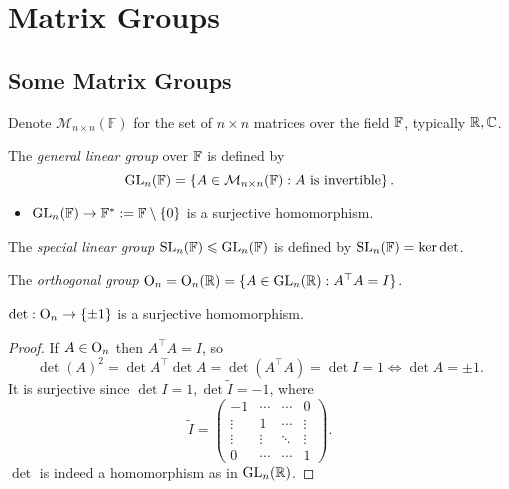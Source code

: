 \documentclass[10pt]{article}
\def\le{\leqslant}
\begin{document}
    \section{Matrix Groups}
    \subsection{Some Matrix Groups}
    Denote $ \mathcal{M}_{n\times n}(\mathbb{F}) $ for the set of $ n \times n $ matrices over the field ${\mathbb{F}}$, typically ${\mathbb{R}},{\mathbb{C}}$.

    \begin{definition}
        The \textit{general linear group} over ${\mathbb{F}}$ is defined by 
        \[
            \mathrm{GL}_n({\mathbb{F}})=\left\{ A\in \mathcal{M}_{n\times n}(\mathbb{F}):A \text{ is invertible} \right\}.
        \]
    \end{definition}
    \begin{proposition}
        \begin{itemize}
            \item $ \mathrm{GL}_n({\mathbb{F}}) \to {\mathbb{F}}^*:={\mathbb{F}} \setminus \{0\} $ is a surjective homomorphism.
        \end{itemize}
    \end{proposition}
    \begin{definition}
        The \textit{special linear group} $ \SL_n(\bbF) \le \GL_n(\bbF) $ is defined by $ \mathrm{SL}_n({\mathbb{F}}) = \ker \det $.
    \end{definition}
    \begin{definition}
        The \textit{orthogonal group} $ \mathrm{O}_n=\mathrm{O}_n({\mathbb{R}})=\{A\in \mathrm{GL}_n({\mathbb{R}}): A^\top A=I\} $.
    \end{definition}
    \begin{proposition}\label{prop:7.4}
        $ \det : \mathrm{O}_n\to \left\{ \pm 1 \right\} $ is a surjective homomorphism.
    \end{proposition}
    \begin{proof}
        If $A\in \mathrm{O}_n$ then $A^\top A=I$, so 
        \[
            \det (A)^2=\det A^\top \det A = \det (A^\top A)=\det I=1 \Longleftrightarrow \det A=\pm 1.
        \] 
        It is surjective since $ \det I=1, \det \tilde{I}=-1 $, where 
        \[
            \tilde{I}=\begin{pmatrix}
                -1&\cdots &\cdots &0\\
                \vdots &1& \cdots &\vdots \\
                \vdots &\vdots &\ddots &\vdots \\
                0&\cdots&\cdots &1
            \end{pmatrix}.
        \]
        $ \det  $ is indeed a homomorphism as in $ \mathrm{GL}_n({\mathbb{R}}) $.
    \end{proof}
\end{document}
